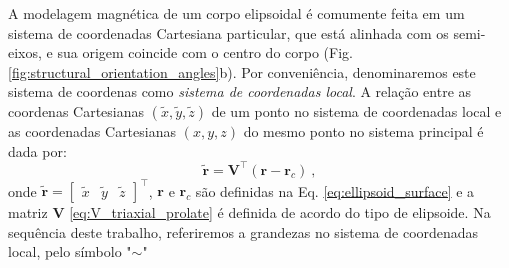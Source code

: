 A modelagem magnética de um corpo elipsoidal é comumente feita em um sistema de coordenadas Cartesiana particular, que está alinhada com os semi-eixos, e sua origem coincide com o centro do corpo (Fig. \ref{fig:structural_orientation_angles}b). Por conveniência, denominaremos este sistema de coordenas como \textit{sistema de coordenadas local}.
A relação entre as coordenas Cartesianas $(\tilde{x}, \tilde{y}, \tilde{z})$
de um ponto no sistema de coordenadas local e as coordenadas Cartesianas $(x, y, z)$ do mesmo ponto no sistema principal é dada por:
\begin{equation}
\tilde{\mathbf{r}} = \mathbf{V}^{\top} \left( \mathbf{r} - \mathbf{r}_{c} \right) \: ,
\label{eq:coord_transformation}
\end{equation}
onde 
$\tilde{\mathbf{r}} = [\begin{array}{ccc} \tilde{x} & 
\tilde{y} & 
\tilde{z} \end{array} ]^{\top}$,
$\mathbf{r}$ e $\mathbf{r}_{c}$
são definidas na Eq. \ref{eq:ellipsoid_surface} e a matriz $\mathbf{V}$ \ref{eq:V_triaxial_prolate}
é definida de acordo do tipo de elipsoide. Na sequência deste trabalho, referiremos a grandezas no sistema de coordenadas local, pelo símbolo "$\sim$"

